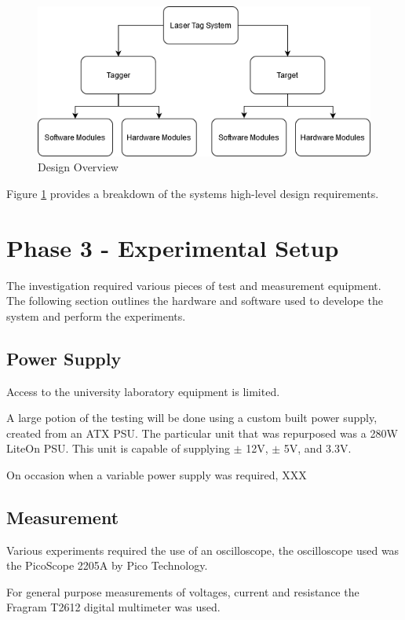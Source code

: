 \begin{figure}[H]
	\centering
	\includegraphics[width=0.7\linewidth]{figures/methodology/design_overview}
	\caption{Design Overview}
	\label{fig:designoverview}
\end{figure}

Figure \ref{fig:designoverview} provides a breakdown of the systems high-level design requirements.



\section{Phase 3 - Experimental Setup}

The investigation required various pieces of test and measurement equipment. The following section outlines the hardware and software used to develope the system and perform the experiments.

\subsection{Power Supply}
Access to the university laboratory equipment is limited.

A large potion of the testing will be done using a custom built power supply, created from an ATX PSU. The particular unit that was repurposed was a 280W LiteOn PSU. This unit is capable of supplying $\pm$ 12V, $\pm$ 5V, and 3.3V.

On occasion when a variable power supply was required, XXX

\subsection{Measurement}

Various experiments required the use of an oscilloscope, the oscilloscope used was the PicoScope 2205A by Pico Technology.

For general purpose measurements of voltages, current and resistance the Fragram T2612 digital multimeter was used.

